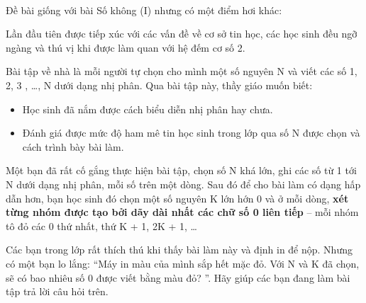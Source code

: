  

Đề bài giống với bài Số không (I) nhưng có một điểm hơi khác:

Lần đầu tiên được tiếp xúc với các vấn đề về cơ sở tin học, các học sinh đều ngỡ ngàng và thú vị khi được làm quan với hệ đếm cơ số 2.

Bài tập về nhà là mỗi người tự chọn cho mình một số nguyên N và viết các số 1, 2, 3 , …, N dưới dạng nhị phân. Qua bài tập này, thầy giáo muốn biết:
\begin{itemize}
	\item Học sinh đã nắm được cách biểu diễn nhị phân hay chưa.
	\item Đánh giá được mức độ ham mê tin học sinh trong lớp qua số N được chọn và cách trình bày bài làm.
\end{itemize}

Một bạn đã rất cố gắng thực hiện bài tập, chọn số N khá lớn, ghi các số từ 1 tới N dưới dạng nhị phân, mỗi số trên một dòng. Sau đó để cho bài làm có dạng hấp dẫn hơn, bạn học sinh đó chọn một số nguyên K lớn hớn 0 và ở mỗi dòng, \textbf{xét từng nhóm được tạo bởi dãy dài nhất các chữ số 0 liên tiếp} – mỗi nhóm tô đỏ các 0 thứ nhất, thứ K + 1, 2K + 1, …

Các bạn trong lớp rất thích thú khi thấy bài làm này và định in để nộp. Nhưng có một bạn lo lắng: “Máy in màu của mình sắp hết mặc đỏ. Với N và K đã chọn, sẽ có bao nhiêu số 0 được viết bằng màu đỏ? ”. Hãy giúp các bạn đang làm bài tập trả lời câu hỏi trên.